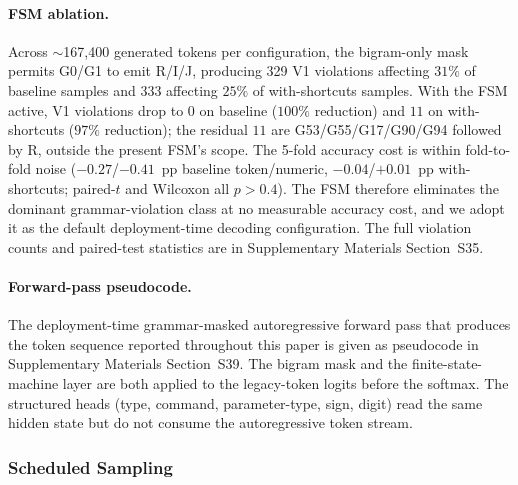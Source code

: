 \documentclass[sensors,article,submit,moreauthors,pdftex]{Definitions/mdpi}
\begin{document}
\paragraph{FSM ablation.} Across $\sim$167{,}400 generated tokens per configuration, the bigram-only mask permits G0/G1 to emit R/I/J, producing 329 V1 violations affecting $31\%$ of baseline samples and 333 affecting $25\%$ of with-shortcuts samples. With the FSM active, V1 violations drop to $0$ on baseline ($100\%$ reduction) and $11$ on with-shortcuts ($97\%$ reduction); the residual $11$ are G53/G55/G17/G90/G94 followed by R, outside the present FSM's scope. The 5-fold accuracy cost is within fold-to-fold noise ($-0.27$/$-0.41$~pp baseline token/numeric, $-0.04$/$+0.01$~pp with-shortcuts; paired-$t$ and Wilcoxon all $p>0.4$). The FSM therefore eliminates the dominant grammar-violation class at no measurable accuracy cost, and we adopt it as the default deployment-time decoding configuration. The full violation counts and paired-test statistics are in Supplementary Materials Section~S35.

\paragraph{Forward-pass pseudocode.} The deployment-time grammar-masked autoregressive forward pass that produces the token sequence reported throughout this paper is given as pseudocode in Supplementary Materials Section~S39. The bigram mask and the finite-state-machine layer are both applied to the legacy-token logits before the softmax. The structured heads (type, command, parameter-type, sign, digit) read the same hidden state but do not consume the autoregressive token stream.

\subsubsection{Scheduled Sampling}
\label{sec:scheduled-sampling}
\end{document}
